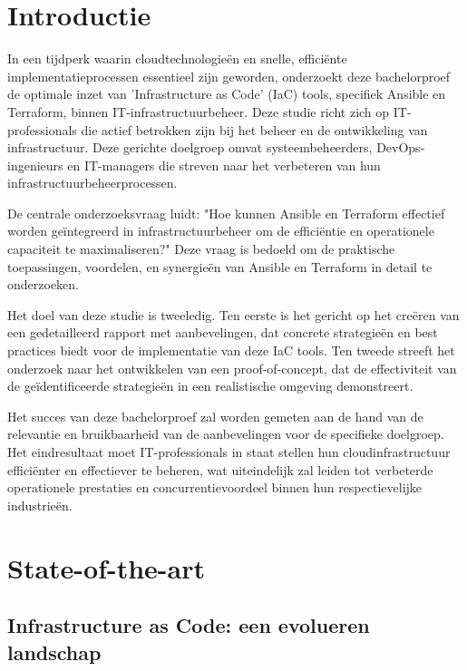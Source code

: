 
\section{Introductie}%
\label{sec:introductie}

In een tijdperk waarin cloudtechnologieën en snelle, efficiënte implementatieprocessen essentieel zijn geworden, onderzoekt deze bachelorproef de optimale inzet van 'Infrastructure as Code' (IaC) tools, specifiek Ansible en Terraform, binnen IT-infrastructuurbeheer. Deze studie richt zich op IT-professionals die actief betrokken zijn bij het beheer en de ontwikkeling van infrastructuur. Deze gerichte doelgroep omvat systeembeheerders, DevOps-ingenieurs en IT-managers die streven naar het verbeteren van hun infrastructuurbeheerprocessen.

De centrale onderzoeksvraag luidt: "Hoe kunnen Ansible en Terraform effectief worden geïntegreerd in infrastructuurbeheer om de efficiëntie en operationele capaciteit te maximaliseren?" Deze vraag is bedoeld om de praktische toepassingen, voordelen, en synergieën van Ansible en Terraform in detail te onderzoeken.

Het doel van deze studie is tweeledig. Ten eerste is het gericht op het creëren van een gedetailleerd rapport met aanbevelingen, dat concrete strategieën en best practices biedt voor de implementatie van deze IaC tools. Ten tweede streeft het onderzoek naar het ontwikkelen van een proof-of-concept, dat de effectiviteit van de geïdentificeerde strategieën in een realistische omgeving demonstreert.

Het succes van deze bachelorproef zal worden gemeten aan de hand van de relevantie en bruikbaarheid van de aanbevelingen voor de specifieke doelgroep. Het eindresultaat moet IT-professionals in staat stellen hun cloudinfrastructuur efficiënter en effectiever te beheren, wat uiteindelijk zal leiden tot verbeterde operationele prestaties en concurrentievoordeel binnen hun respectievelijke industrieën.


\section{State-of-the-art}%
\label{sec:state-of-the-art}

\subsection{Infrastructure as Code: een evolueren landschap}

